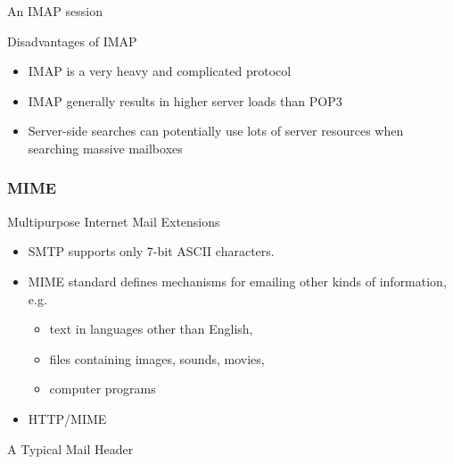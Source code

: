 \begin{frame}
  \begin{block}{An IMAP session}
    \begin{center}
    \end{center}
  \end{block}
\end{frame}
  
\begin{frame}
  \begin{block}{Disadvantages of IMAP}
    \begin{itemize}
    \item IMAP is a very heavy and complicated protocol
    \item IMAP generally results in higher server loads than POP3
    \item Server-side searches can potentially use lots of server resources when searching
      massive mailboxes
    \end{itemize}
  \end{block}
\end{frame}

\subsubsection{MIME}

\begin{frame}{Multipurpose Internet Mail Extensions}
  \begin{itemize}
  \item SMTP supports only 7-bit ASCII characters.
  \item MIME standard defines mechanisms for emailing other kinds of information, e.g.
    \begin{itemize}
    \item text in languages other than English,
    \item files containing images, sounds, movies,
    \item computer programs
    \end{itemize}
  \item HTTP/MIME
  \end{itemize}
\end{frame}

\begin{frame}
  \begin{block}{A Typical Mail Header}
    \begin{center}
    \end{center} \label{fig:mail_header}
  \end{block}
\end{frame}

